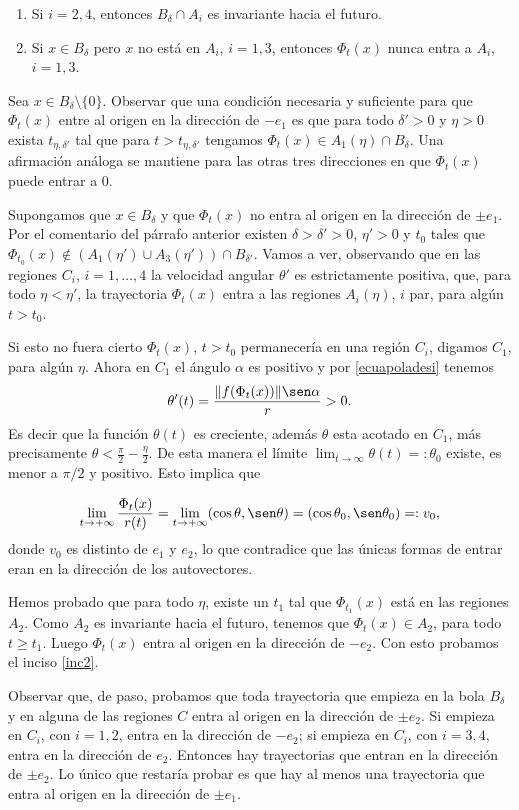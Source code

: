 \begin{demo}
\begin{enumerate}
    \item Si  $i=2,4$, entonces $B_{\delta}\cap A_i$ es invariante hacia
    el futuro.
    \item Si $x\in B_{\delta}$ pero $x$ no está en $A_i$, $i=1,3$,
    entonces $\Phi_t(x)$ nunca entra a $A_i$, $i=1,3$.
\end{enumerate}
Sea $x\in B_{\delta}\setminus\{0\}$. Observar que una condición
necesaria y suficiente para que $\Phi_t(x)$ entre al origen en la
dirección de $-e_1$     es que para todo $\delta'>0$ y $\eta>0$
exista $t_{\eta,\delta'}$ tal que para $t>t_{\eta,\delta'}$
tengamos $\Phi_t(x)\in A_1(\eta)\cap B_{\delta}$. Una afirmación
análoga se mantiene para las otras tres direcciones en que
$\Phi_t(x)$ puede entrar a $0$.

Supongamos que $x\in B_{\delta}$ y que $\Phi_t(x)$ no entra al
origen en la dirección de $\pm e_1$. Por el comentario del párrafo
anterior existen $\delta>\delta'>0$, $\eta'>0$ y $t_0$ tales que
$\Phi_{t_0}(x)\notin (A_1(\eta')\cup A_3(\eta'))\cap B_{\delta'}$.
Vamos a ver, observando que en las regiones $C_i$, $i=1,\ldots,4$
la velocidad angular $\theta'$ es estrictamente positiva, que,
para todo $\eta<\eta'$, la trayectoria $\Phi_t(x)$ entra a las
regiones $A_{i}(\eta)$, $i$ par, para algún $t>t_0$.

Si esto no fuera cierto $\Phi_t(x)$, $t>t_0$ permanecería en una
región $C_i$, digamos $C_1$, para algún $\eta$. Ahora en $C_1$ el
ángulo $\alpha$ es positivo y por \eqref{ecuapoladesi} tenemos
\[
    \theta'(t)=\frac{\|f(\Phi_t(x))\|\sen \alpha}{r}>0.
\]
Es decir que la función $\theta(t)$ es creciente, además $\theta$
esta acotado en $C_1$, más precisamente
$\theta<\frac{\pi}{2}-\frac{\eta}{2}$. De esta manera el límite
$\lim_{t\to\infty}\theta(t)=:\theta_0$ existe, es menor a $\pi/2$
y positivo. Esto implica que

\[
    \lim\limits_{t\to+\infty}\frac{\Phi_t(x)}{r(t)}=\lim\limits_{t\to+\infty}(\cos\theta,\sen\theta)=
    (\cos\theta_0,\sen\theta_0)=:v_0,
\]
donde $v_0$ es distinto de $e_1$ y $e_2$, lo que contradice que
las únicas formas de entrar eran en la dirección de los
autovectores.

 Hemos probado que para todo $\eta$, existe un $t_1$
tal que $\Phi_{t_1}(x)$ está en las regiones $A_2$. Como $A_2$ es
invariante hacia el futuro, tenemos que $\Phi_t(x)\in A_2$, para
todo $t\geq t_1$. Luego $\Phi_t(x)$ entra al origen en la
dirección de $-e_2$. Con esto probamos el inciso \ref{inc2}.

Observar que, de paso,
 probamos que toda trayectoria que empieza en la bola $B_{\delta}$ y en alguna
 de las regiones $C$ entra al origen en la dirección de $\pm e_2$.
 Si empieza en $C_i$, con $i=1,2$, entra en la dirección de
 $-e_2$; si empieza en  $C_i$, con $i=3,4$, entra en la dirección
 de $e_2$. Entonces hay trayectorias que entran en la dirección de
 $\pm e_2$. Lo único que restaría probar es que hay al menos una trayectoria
que entra al origen en la dirección de $\pm e_1$.


\end{demo}
